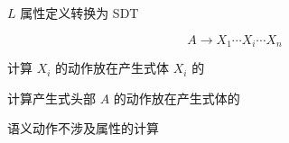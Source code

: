 \begin{frame}{}
  \begin{center}
    $L$ 属性定义转换为 SDT

    \[
      A \to X_{1} \cdots X_{i} \cdots X_{n}
    \]

    \vspace{0.80cm}
    计算 $X_{i}$ 的动作放在产生式体 $X_{i}$ 的

    \vspace{0.30cm}
    计算产生式头部 $A$ 的动作放在产生式体的
  \end{center}
\end{frame}

\begin{frame}{}
  \begin{center}

    \vspace{0.50cm}
     语义动作不涉及属性的计算

    \vspace{0.50cm}
  \end{center}
\end{frame}

\begin{frame}{}
  \begin{center}
    
  \end{center}
\end{frame}

\begin{frame}{}
  \begin{center}
    

    \vspace{0.60cm}
  \end{center}
\end{frame}
